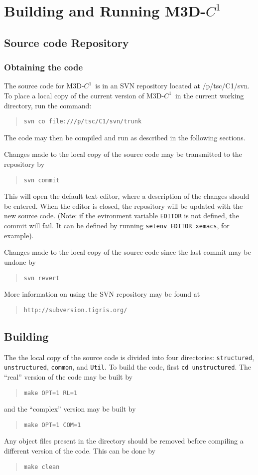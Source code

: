 \documentclass[letterpaper]{book}
\newcommand{\codename}{M3D-$C^1$}
\newcommand{\repositoryloc}{/p/tsc/C1/svn}
\newcommand{\svnurl}{http://subversion.tigris.org/}
\begin{document}
\chapter{Building and Running \codename}

\section{Source code Repository}

\subsection{Obtaining the code}

The source code for \codename\ is in an SVN repository located at
\repositoryloc.  To place a local copy of the current version of
\codename\ in the current working directory, run the command:
\begin{quote}
\texttt{svn co file:///p/tsc/C1/svn/trunk}
\end{quote}
The code may then be compiled and run as described in the following
sections.

Changes made to the local copy of the source code may be transmitted to
the repository by
\begin{quote}
\texttt{svn commit}
\end{quote}
This will open the default text editor, where a description of the
changes should be entered.  When the editor is closed, the repository
will be updated with the new source code.  (Note: if the evironment
variable \texttt{EDITOR} is not defined, the commit will fail.  It can
be defined by running \texttt{setenv EDITOR xemacs}, for example).

Changes made to the local copy of the source code since the last
commit may be undone by
\begin{quote}
\texttt{svn revert}
\end{quote}

More information on using the SVN repository may be found at
\begin{quote}
  \texttt{\svnurl}
\end{quote}




\section{Building}

The the local copy of the source code is divided into four
directories: \texttt{structured}, \texttt{unstructured},
\texttt{common}, and \texttt{Util}.  To build the code, first
\texttt{cd unstructured}.  The ``real'' version of the code may be
built by
\begin{quote}
  \texttt{make OPT=1 RL=1}
\end{quote}
and the ``complex'' version may be built by
\begin{quote}
  \texttt{make OPT=1 COM=1}
\end{quote}
Any object files present in the directory should be removed before
compiling a different version of the code.  This can be done by
\begin{quote}
  \texttt{make clean}
\end{quote}
\end{document}
